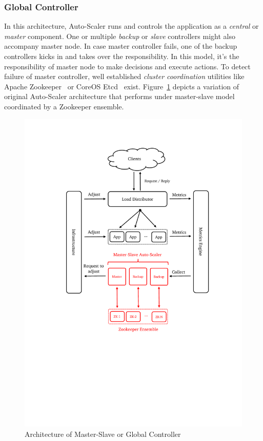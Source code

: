 \subsubsection{Global Controller}
In this architecture, Auto-Scaler runs and controls the application as a \emph{central} or \emph{master} component. One or multiple \emph{backup} or \emph{slave} controllers might also accompany master node. In case master controller fails, one of the backup controllers kicks in and takes over the responsibility. In this model, it's the responsibility of master node to make decisions and execute actions. To detect failure of master controller, well established \emph{cluster coordination} utilities like Apache Zookeeper~\cite{zk} or CoreOS Etcd~\cite{etcd} exist. Figure~\ref{fig:auto-scaler-master-backup} depicts a variation of original Auto-Scaler architecture that performs under master-slave model coordinated by a Zookeeper ensemble.
\begin{figure}[!htbp]
    \includegraphics[clip,trim=3cm 9cm 2.5cm 2.5cm]{auto-scaler-master-backup.pdf}
    \centering
    \caption{Architecture of Master-Slave or Global Controller}
    \label{fig:auto-scaler-master-backup}
\end{figure}
\clearpage
